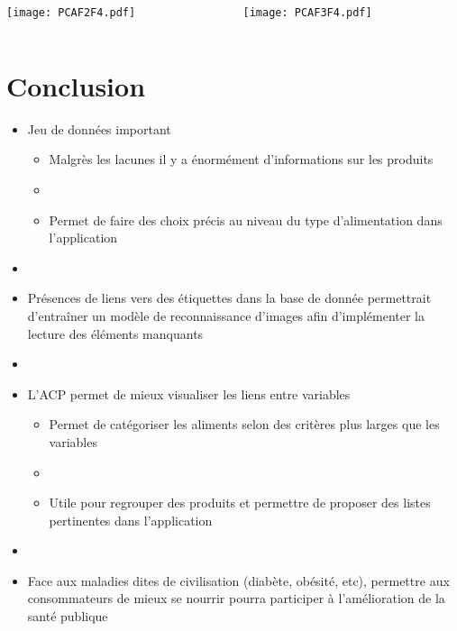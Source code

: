 \begin{frame}
  \begin{columns}
    \begin{column}{.5\textwidth}
      \texttt{[image: PCAF2F4.pdf]}
    \end{column}
    \begin{column}{.5\textwidth}
      \texttt{[image: PCAF3F4.pdf]}
    \end{column}
  \end{columns}
\end{frame}

\section{Conclusion}
\begin{frame}
  \begin{itemize}
    \item Jeu de données important
          \begin{itemize}
            \item Malgrès les lacunes il y a énormément d'informations sur les produits
            \item[]
            \item Permet de faire des choix précis au niveau du type d'alimentation dans l'application
          \end{itemize}
    \item[]
    \item Présences de liens vers des étiquettes dans la base de donnée permettrait d'entraîner un modèle de reconnaissance
          d'images afin d'implémenter la lecture des éléments manquants
    \item[]
    \item L'ACP permet de mieux visualiser les liens entre variables
          \begin{itemize}
            \item Permet de catégoriser les aliments selon des critères plus larges que les variables
            \item[]
            \item Utile pour regrouper des produits et permettre de proposer des listes pertinentes dans l'application
          \end{itemize}
    \item[]
    \item Face aux maladies dites de civilisation (diabète, obésité, etc), permettre aux consommateurs
          de mieux se nourrir pourra participer à l'amélioration de la santé publique
  \end{itemize}
\end{frame}

